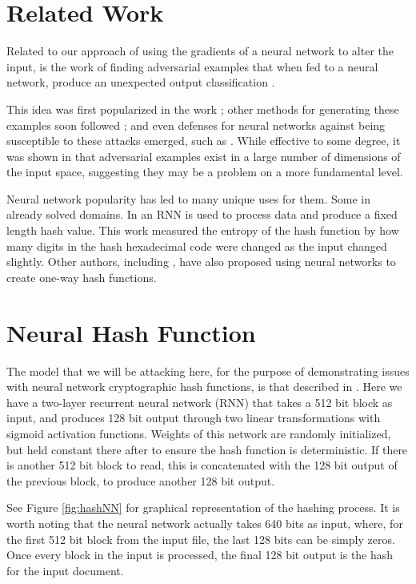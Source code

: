 \documentclass{article}
\begin{document}
\section{Related Work}

Related to our approach of using the gradients of a neural network to alter
the input, is the work of finding adversarial examples that when fed to a
neural network, produce an unexpected output classification \cite{intriguing}.

This idea was first popularized in the work \cite{intriguing}; other methods
for generating these examples soon followed \cite{explaining}; and even defenses
for neural networks against being susceptible to these attacks emerged, such
as \cite{robust, ensemble, distil}. While effective to some degree, it was shown
in \cite{space} that adversarial examples exist in a large number of dimensions
of the input space, suggesting they may be a problem on a more fundamental 
level.

Neural network popularity has led to many unique uses for them. Some in already
solved domains. In \cite{hash1} an RNN is used to process data and produce
a fixed length hash value. This work measured the entropy of the hash function
by how many digits in the hash hexadecimal code were changed as the input changed slightly. Other authors,
including \cite{hash2}, have also proposed using neural networks to create
one-way hash functions.

\section{Neural Hash Function}

The model that we will be attacking here, for the purpose of demonstrating
issues with neural network cryptographic hash functions, is that described in
\cite{hash1}.  Here we have a two-layer recurrent neural network (RNN) that
takes a 512 bit block as input, and produces 128 bit output through two linear
transformations with sigmoid activation functions. Weights of this network are
randomly initialized, but held constant there after to ensure the hash function
is deterministic. If there is another 512 bit block to read, this is
concatenated with the 128 bit output of the previous block, to produce another
128 bit output. 

See Figure \ref{fig:hashNN} for graphical representation of the hashing
process. It is worth noting that the neural network actually takes 640 bits
as input, where, for the first 512 bit block from the input file, the last
128 bits can be simply zeros. Once every block in the input is processed, the 
final 128 bit output is the hash for the input document.
\end{document}
